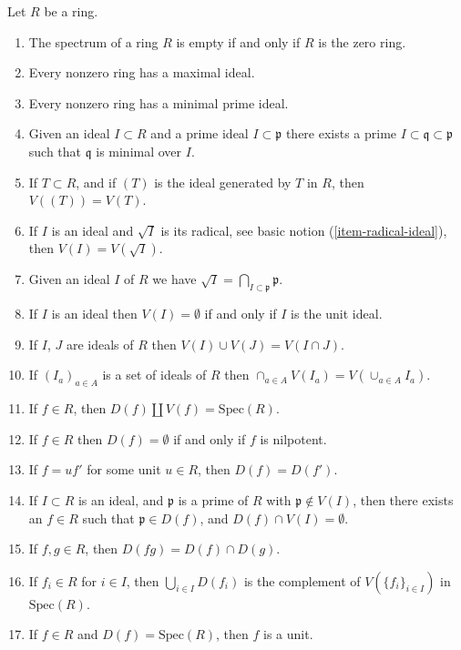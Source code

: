 \begin{lemma}
\label{lemma-Zariski-topology}
Let $R$ be a ring.
\begin{enumerate}
\item The spectrum of a ring $R$ is empty if and only if $R$
is the zero ring.
\item Every nonzero ring has a maximal ideal.
\item Every nonzero ring has a minimal prime ideal.
\item Given an ideal $I \subset R$ and a prime ideal
$I \subset \mathfrak p$ there exists a prime
$I \subset \mathfrak q \subset \mathfrak p$ such
that $\mathfrak q$ is minimal over $I$.
\item If $T \subset R$, and if $(T)$ is the ideal generated by
$T$ in $R$, then $V((T)) = V(T)$.
\item If $I$ is an ideal and $\sqrt{I}$ is its radical,
see basic notion (\ref{item-radical-ideal}), then $V(I) = V(\sqrt{I})$.
\item Given an ideal $I$ of $R$ we have $\sqrt{I} =
\bigcap_{I \subset \mathfrak p} \mathfrak p$.
\item If $I$ is an ideal then $V(I) = \emptyset$ if and only
if $I$ is the unit ideal.
\item If $I$, $J$ are ideals of $R$ then $V(I) \cup V(J) =
V(I \cap J)$.
\item If $(I_a)_{a\in A}$ is a set of ideals of $R$ then
$\cap_{a\in A} V(I_a) = V(\cup_{a\in A} I_a)$.
\item If $f \in R$, then $D(f) \coprod V(f) = \text{Spec}(R)$.
\item If $f \in R$ then $D(f) = \emptyset$ if and only if $f$
is nilpotent.
\item If $f = u f'$ for some unit $u \in R$, then $D(f) = D(f')$.
\item If $I \subset R$ is an ideal, and $\mathfrak p$ is a prime of
$R$ with $\mathfrak p \not\in V(I)$, then there exists an $f \in R$
such that $\mathfrak p \in D(f)$, and $D(f) \cap V(I) = \emptyset$.
\item If $f, g \in R$, then $D(fg) = D(f) \cap D(g)$.
\item If $f_i \in R$ for $i \in I$, then
$\bigcup_{i\in I} D(f_i)$ is the complement of $V(\{f_i \}_{i\in I})$
in $\text{Spec}(R)$.
\item If $f \in R$ and $D(f) = \text{Spec}(R)$, then $f$ is a unit.
\end{enumerate}
\end{lemma}

